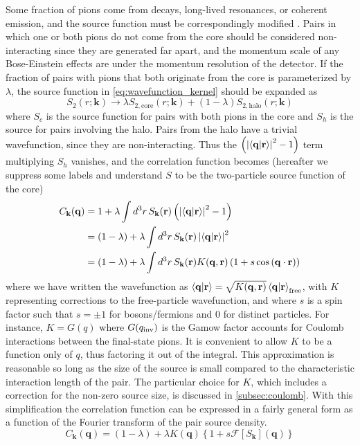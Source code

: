 Some fraction of pions come from decays, long-lived resonances, or coherent emission, and the source function must be correspondingly modified \cite{Bowler:1991vx,Sinyukov:1998fc}.
Pairs in which one or both pions do not come from the core should be considered non-interacting since they are generated far apart, and the momentum scale of any Bose-Einstein effects are under the momentum resolution of the detector.
If the fraction of pairs with pions that both originate from the core is parameterized by $\lambda$, the source function in \cref{eq:wavefunction_kernel} should be expanded as
\begin{equation} S_{2}(r;\mathbf{k}) \rightarrow \lambda S_{2,\textrm{core}} (r;\mathbf{k}) + (1-\lambda) S_{2,\textrm{halo}} (r;\mathbf{k}) \end{equation}
where $S_c$ is the source function for pairs with both pions in the core and $S_h$ is the source for pairs involving the halo.
Pairs from the halo have a trivial wavefunction, since they are non-interacting.
Thus the $\left(\left|\braket{\mathbf{q}|\mathbf{r}}\right|^2 - 1\right)$ term multiplying $S_h$ vanishes, and the correlation function becomes (hereafter we suppress some labels and understand $S$ to be the two-particle source function of the core)
\begin{align}
C_\mathbf{k}(\mathbf{q}) &= 1 + \lambda \int d^3 r \, S_{\mathbf{k}}(\mathbf{r}) \left(\left|\braket{\mathbf{q}|\mathbf{r}}\right|^2 - 1 \right)\\
&= (1-\lambda) + \lambda \int d^3 r \, S_{\mathbf{k}}(\mathbf{r}) \left|\braket{\mathbf{q}|\mathbf{r}}\right|^2\\
&= (1-\lambda) + \lambda \int d^3 r \, S_{\mathbf{k}}(\mathbf{r}) K(\mathbf{q},\mathbf{r}) \left(1 + s \cos\left(\mathbf{q}\cdot\mathbf{r}\right)\right)
\end{align}
where we have written the wavefunction as $\braket{\mathbf{q}|\mathbf{r}} = \sqrt{K(\mathbf{q},\mathbf{r})} \braket{\mathbf{q}|\mathbf{r}}_{\textrm{free}}$, with $K$ representing corrections to the free-particle wavefunction, and where $s$ is a spin factor such that $s = \pm 1$ for bosons/fermions and $0$ for distinct particles.
For instance, $K = G(q)$ where $G(q_{\mathrm{inv}})$ is the Gamow factor accounts for Coulomb interactions between the final-state pions.
It is convenient to allow $K$ to be a function only of $q$, thus factoring it out of the integral.
This approximation is reasonable so long as the size of the source is small compared to the characteristic interaction length of the pair.
The particular choice for $K$, which includes a correction for the non-zero source size, is discussed in \cref{subsec:coulomb}.
With this simplification the correlation function can be expressed in a fairly general form as a function of the Fourier transform of the pair source density.
\begin{equation} \label{eq:correlation_function}
C_\mathbf{k}(\mathbf{q}) = (1-\lambda) + \lambda K(\mathbf{q})\left\{ 1 + s \mathcal{F} \left[ S_\mathbf{k} \right](\mathbf{q}) \right\}
\end{equation}


